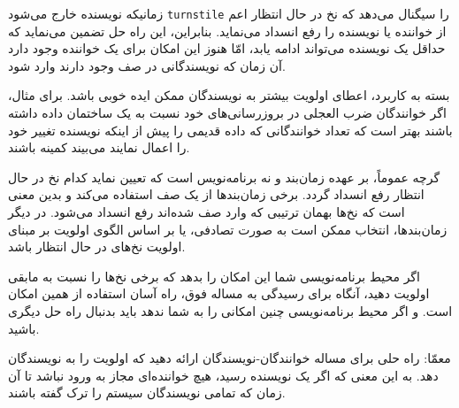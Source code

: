 \documentclass{book}
\begin{document}
    زمانیکه نویسنده خارج می‌شود  {\tt turnstile} را سیگنال می‌دهد که نخ‌ در حال انتظار اعم از خواننده یا نویسنده را رفع انسداد می‌نماید. 
    بنابراین، این راه حل تضمین می‌نماید که حداقل یک نویسنده می‌تواند ادامه یابد، امّا هنوز این امکان برای یک خواننده وجود دارد آن زمان که 
    نویسندگانی در صف وجود دارند وارد شود. 
    
    بسته به کاربرد، اعطای اولویت بیشتر به نویسندگان ممکن ایده خوبی باشد. برای مثال، اگر خوانندگان ضرب العجلی در بروزرسانی‌های خود 
    نسبت به یک ساختمان داده‌ داشته باشند 
    بهتر است که تعداد خوانندگانی که داده قدیمی را پیش از اینکه نویسنده تغییر خود را اعمال نمایند می‌بیند کمینه باشند. 

    گرچه عموماً، بر عهده زمان‌بند و نه برنامه‌نویس است که تعیین نماید کدام نخ در حال انتظار رفع انسداد گردد. 
    برخی زمان‌بندها از یک صف  استفاده می‌کند و بدین معنی است که نخ‌ها بهمان ترتیبی که 
    وارد صف شده‌اند رفع انسداد می‌شود. در دیگر زمان‌بندها، انتخاب ممکن است به صورت تصادفی، یا بر اساس الگوی اولویت  
    بر مبنای اولویت نخ‌های در حال انتظار باشد. 

    اگر محیط برنامه‌نویسی شما این امکان را بدهد که برخی نخ‌ها را نسبت به مابقی اولویت دهید، آنگاه برای رسیدگی به مساله فوق، راه آسان استفاده از همین امکان است. 
    و اگر محیط برنامه‌نویسی چنین امکانی را به شما ندهد باید بدنبال راه حل دیگری باشید. 

    معمّا: راه حلی برای مساله خوانندگان-نویسندگان ارائه دهید که اولویت را به نویسندگان  دهد. به این معنی که اگر یک نویسنده رسید، هیچ خواننده‌ای  
    مجاز به ورود نباشد تا آن زمان که تمامی نویسندگان سیستم را ترک گفته باشند. 
\end{document}
